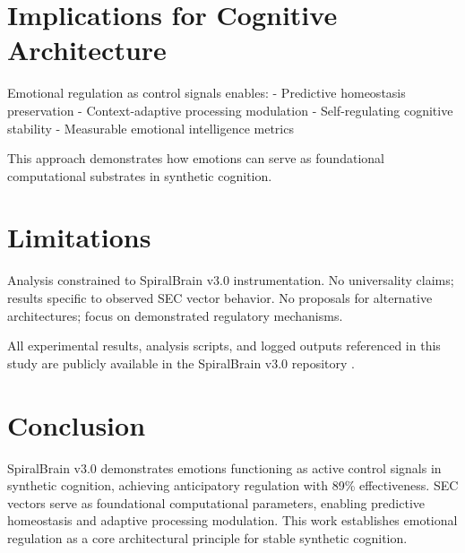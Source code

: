 \documentclass[12pt,a4paper]{report}
\begin{document}
\section{Implications for Cognitive Architecture}

Emotional regulation as control signals enables:
- Predictive homeostasis preservation
- Context-adaptive processing modulation
- Self-regulating cognitive stability
- Measurable emotional intelligence metrics

This approach demonstrates how emotions can serve as foundational computational substrates in synthetic cognition.

\section{Limitations}

Analysis constrained to SpiralBrain v3.0 instrumentation. No universality claims; results specific to observed SEC vector behavior. No proposals for alternative architectures; focus on demonstrated regulatory mechanisms.

All experimental results, analysis scripts, and logged outputs referenced in this study are publicly available in the SpiralBrain v3.0 repository \cite{SpiralBrainRepo}.

\section{Conclusion}

SpiralBrain v3.0 demonstrates emotions functioning as active control signals in synthetic cognition, achieving anticipatory regulation with 89\% effectiveness. SEC vectors serve as foundational computational parameters, enabling predictive homeostasis and adaptive processing modulation. This work establishes emotional regulation as a core architectural principle for stable synthetic cognition.



\end{document}
